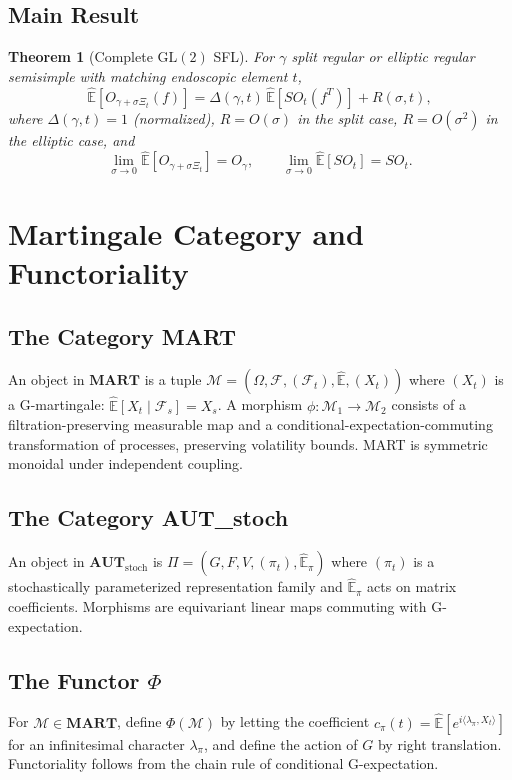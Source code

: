 \documentclass[11pt,a4paper]{article}
\newtheorem{theorem}{Theorem}[section]
\theoremstyle{definition}
\newcommand{\GL}{\mathrm{GL}}
\newcommand{\MART}{\mathbf{MART}}
\newcommand{\AUT}{\mathbf{AUT}_{\mathrm{stoch}}}
\newcommand{\GExp}{\hat{\mathbb{E}}}
\begin{document}
\subsection{Main Result}

\begin{theorem}[Complete $\GL(2)$ SFL]\label{thm:main_sfl}
For $\gamma$ split regular or elliptic regular semisimple with matching endoscopic element $t$,
\[
\GExp\left[O_{\gamma+\sigma\Xi_t}(f)\right] = \Delta(\gamma,t)\, \GExp\left[SO_t(f^T)\right] + R(\sigma,t),
\]
where $\Delta(\gamma,t)=1$ (normalized), $R = O(\sigma)$ in the split case, $R = O(\sigma^2)$ in the elliptic case, and
\[
\lim_{\sigma\to 0} \GExp[O_{\gamma+\sigma\Xi_t}] = O_\gamma, \qquad \lim_{\sigma\to 0} \GExp[SO_t] = SO_t.
\]
\end{theorem}

\section{Martingale Category and Functoriality}\label{sec:functor}

\subsection{The Category MART}

An object in $\MART$ is a tuple $\mathcal{M} = (\Omega, \mathcal{F}, (\mathcal{F}_t), \GExp, (X_t))$ where $(X_t)$ is a G-martingale: $\GExp[X_t \mid \mathcal{F}_s] = X_s$. A morphism $\phi: \mathcal{M}_1 \to \mathcal{M}_2$ consists of a filtration-preserving measurable map and a conditional-expectation-commuting transformation of processes, preserving volatility bounds. MART is symmetric monoidal under independent coupling.

\subsection{The Category AUT\_stoch}

An object in $\AUT$ is $\Pi = (G, F, V, (\pi_t), \GExp_\pi)$ where $(\pi_t)$ is a stochastically parameterized representation family and $\GExp_\pi$ acts on matrix coefficients. Morphisms are equivariant linear maps commuting with G-expectation.

\subsection{The Functor $\Phi$}

For $\mathcal{M} \in \MART$, define $\Phi(\mathcal{M})$ by letting the coefficient $c_\pi(t) = \GExp[e^{i\langle\lambda_\pi, X_t\rangle}]$ for an infinitesimal character $\lambda_\pi$, and define the action of $G$ by right translation. Functoriality follows from the chain rule of conditional G-expectation.
\end{document}
